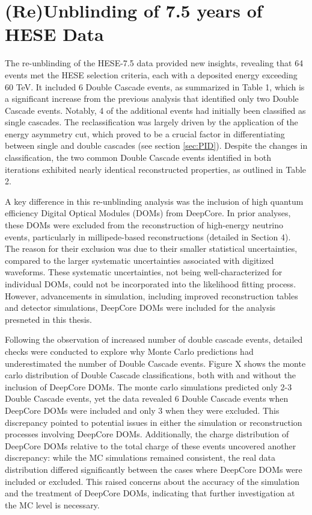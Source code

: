 \section{(Re)Unblinding of 7.5 years of HESE Data}
\label{sec:HESE7}
The re-unblinding of the HESE-7.5 data provided new insights, revealing that 64 events met the HESE selection criteria, each with a deposited energy exceeding 60 TeV. It included 6 Double Cascade events, as summarized in Table 1, which is a significant increase from the previous analysis that identified only two Double Cascade events. Notably, 4 of the additional events had initially been classified as single cascades. The reclassification was largely driven by the application of the energy asymmetry cut, which proved to be a crucial factor in differentiating between single and double cascades (see section \ref{sec:PID}). Despite the changes in classification, the two common Double Cascade events identified in both iterations exhibited nearly identical reconstructed properties, as outlined in Table 2.

A key difference in this re-unblinding analysis was the inclusion of high quantum efficiency Digital Optical Modules (DOMs) from DeepCore. In prior analyses, these DOMs were excluded from the reconstruction of high-energy neutrino events, particularly in millipede-based reconstructions (detailed in Section 4). The reason for their exclusion was due to their smaller statistical uncertainties, compared to the larger systematic uncertainties associated with digitized waveforms. These systematic uncertainties, not being well-characterized for individual DOMs, could not be incorporated into the likelihood fitting process. However, advancements in simulation, including improved reconstruction tables and detector simulations, DeepCore DOMs were included for the analysis presneted in this thesis.

Following the observation of increased number of double cascade events, detailed checks were conducted to explore why Monte Carlo predictions had underestimated the number of Double Cascade events. Figure X shows the monte carlo distribution of Double Cascade classifications, both with and without the inclusion of DeepCore DOMs. The monte carlo simulations predicted only 2-3 Double Cascade events, yet the data revealed 6 Double Cascade events when DeepCore DOMs were included and only 3 when they were excluded. This discrepancy pointed to potential issues in either the simulation or reconstruction processes involving DeepCore DOMs. Additionally, the charge distribution of DeepCore DOMs relative to the total charge of these events uncovered another discrepancy: while the MC simulations remained consistent, the real data distribution differed significantly between the cases where DeepCore DOMs were included or excluded. This raised concerns about the accuracy of the simulation and the treatment of DeepCore DOMs, indicating that further investigation at the MC level is necessary.

